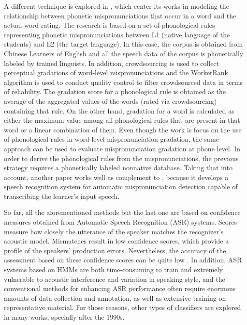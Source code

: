 A different technique is explored in \cite{phonological_rules}, which center its works
in modeling the relationship between phonetic mispronunciations that occur in a word
and the actual word rating. The research is based on a set of phonological rules
representing phonetic mispronunciations between L1 (native language of the students)
and L2 (the target language). In this case, the corpus is obtained from Chinese Learners
of English and all the speech data of the corpus is phonetically labeled by trained linguists.
In addition, crowdsourcing is used to collect perceptual gradations of word-level 
mispronunciations and the WorkerRank algorithm is used to conduct quality control to filter
crowdsourced data in terms of reliability. The gradation score for a phonological rule
is obtained as the average of the aggregated values of the words (rated via crowdsourcing)
containing that rule. On the other hand, gradation for a word is calculated as either
the maximum value among all phonological rules that are present in 
that word or a linear combination
of them. Even though the work is focus on the use of phonological rules in word-level
mispronunciation gradation, the same approach can be used to evaluate mispronunciation
gradation at phone level. In order to derive the phonological rules from the mispronunciations,
the previous strategy requires a phonetically labeled nonnative database. 
Taking that into account, another paper \cite{phonological_rules_2} works well as complement
to \cite{phonological_rules}, because it develops a speech recognition system for automatic
mispronunciation detection capable of transcribing the learner's input speech.

So far, all the aforementioned methods but the last one are based on confidence measures 
obtained from Automatic Speech Recognition (ASR) systems. 
Scores measure how closely the utterance of the speaker matches the recognizer's
acoustic model. Mismatches result in low confidence scores, which provide a profile of the 
speakers' production errors. Nevertheless, the accuracy of the assessment based on these
confidence scores can be quite low \cite{landmark_svm}. 
In addition, ASR systems based on HMMs are both time-consuming to train and extremely vulnerable to
acoustic interference and variation in speaking style, and the conventional methods for
enhancing ASR performance often require enormous amounts of data collection and annotation,
as well as extensive training on representative material.
For those reasons, other types of classifiers are explored in many works, specially after
the 1990s. 

